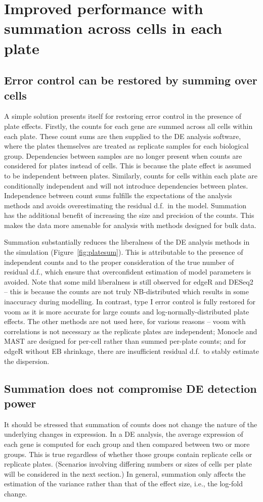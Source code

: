 \documentclass[oupdraft]{bio}
\begin{document}
\section{Improved performance with summation across cells in each plate}

\subsection{Error control can be restored by summing over cells}
A simple solution presents itself for restoring error control in the presence of plate effects.
Firstly, the counts for each gene are summed across all cells within each plate.
These count sums are then supplied to the DE analysis software, where the plates themselves are treated as replicate samples for each biological group.
Dependencies between samples are no longer present when counts are considered for plates instead of cells.
This is because the plate effect is assumed to be independent between plates. 
Similarly, counts for cells within each plate are conditionally independent and will not introduce dependencies between plates.
Independence between count sums fulfills the expectations of the analysis methods and avoids overestimating the residual d.f.\ in the model.
Summation has the additional benefit of increasing the size and precision of the counts.
This makes the data more amenable for analysis with methods designed for bulk data.

Summation substantially reduces the liberalness of the DE analysis methods in the simulation (Figure~\ref{fig:platesum}).
This is attributable to the presence of independent counts and to the proper consideration of the true number of residual d.f., 
    which ensure that overconfident estimation of model parameters is avoided.
Note that some mild liberalness is still observed for edgeR and DESeq2 
    -- this is because the counts are not truly NB-distributed which results in some inaccuracy during modelling.
In contrast, type I error control is fully restored for voom as it is more accurate for large counts and log-normally-distributed plate effects.
The other methods are not used here, for various reasons -- voom with correlations is not necessary as the replicate plates are independent;
    Monocle and MAST are designed for per-cell rather than summed per-plate counts;
    and for edgeR without EB shrinkage, there are insufficient residual d.f.\ to stably estimate the dispersion.

\subsection{Summation does not compromise DE detection power}
It should be stressed that summation of counts does not change the nature of the underlying changes in expression.
In a DE analysis, the average expression of each gene is computed for each group and then compared between two or more groups.
This is true regardless of whether those groups contain replicate cells or replicate plates. 
(Scenarios involving differing numbers or sizes of cells per plate will be considered in the next section.)
In general, summation only affects the estimation of the variance rather than that of the effect size, i.e., the log-fold change.
\end{document}
